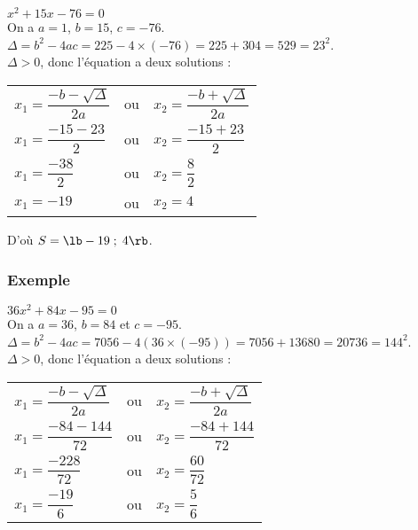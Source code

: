 $x^2 + 15x - 76 = 0$ \\

On a $a = 1$, $b = 15$, $c = -76$. \\

$ \Delta = b^2 - 4ac = 225 - 4 \times \left(-76\right) = 225 + 304 = 529 = 23^2$. \\

$\Delta > 0$, donc l'équation a deux solutions : \\

\begin{tabular}{lll}
$x_1 = \dfrac{-b - \sqrt{\Delta}}{2a}$ & ou & $x_2 = \dfrac{-b + \sqrt{\Delta}}{2a}$ \vspace*{.3cm} \\
$ x_1 = \dfrac{-15 - 23}{2}$ & ou &$x_2 = \dfrac{-15 + 23}{2}$ \vspace*{.3cm} \\
$x_1 = \dfrac{-38}{2}$ & ou & $x_2 = \dfrac{8}{2}$ \vspace*{.3cm} \\
$x_1 = -19$ & ou &$x_2 = 4$ \\
\end{tabular}

\vspace*{.3cm}

D'où $S = \lb -19 \; ; \; 4 \rb$. 

\newpage

\subsubsection{Exemple }

$36x^2 + 84x - 95 = 0$ \\

On a $a = 36$, $b = 84$ et $c = -95$. \\

$\Delta = b^2 - 4ac = 7056 - 4\left(36 \times \left(-95\right)\right) = 7056 + 13680 = 20 736 = 144^2$. \\

$\Delta > 0$, donc l'équation a deux solutions : \\

\begin{tabular}{lll}
$x_1 = \dfrac{-b - \sqrt{\Delta}}{2a}$ & ou & $x_2 = \dfrac{-b + \sqrt{\Delta}}{2a}$ \vspace*{.3cm} \\
$x_1 = \dfrac{-84 - 144}{72}$ & ou & $x_2 = \dfrac{-84 + 144}{72}$ \vspace*{.3cm} \\
$x_1 = \dfrac{-228}{72}$ & ou & $x_2 = \dfrac{60}{72}$ \vspace*{.3cm} \\
$x_1 = \dfrac{-19}{6}$ & ou & $x_2 = \dfrac{5}{6}$ \\
\end{tabular}

